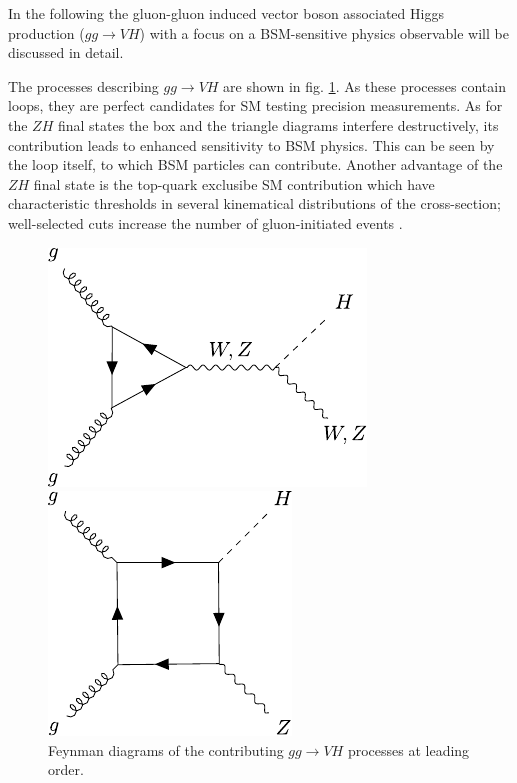 In the following the gluon-gluon induced vector boson associated Higgs production ($gg\rightarrow VH$) with a focus on a BSM-sensitive physics observable will be discussed in detail.


The processes describing $gg\rightarrow VH$ are shown in fig. \ref{fig:VH_diagrams}. As these processes contain loops, they are perfect candidates for SM testing precision measurements. As for the $ZH$ final states the box and the triangle diagrams interfere destructively, its contribution leads to enhanced sensitivity to BSM physics. This can be seen by the loop itself, to which BSM particles can contribute. Another advantage of the $ZH$ final state is the top-quark exclusibe SM contribution which have characteristic thresholds in several kinematical distributions of the cross-section; well-selected cuts increase the number of gluon-initiated events \cite{Harlander_2018}.

\begin{figure}[h!]
	\centering
	\begin{minipage}{.5\textwidth}
		\centering
		\includegraphics[width=0.8\linewidth]{figures/theory/diagrams/ggVH_triangle.pdf}
	\end{minipage}%
	\begin{minipage}{.5\textwidth}
		\centering
		\includegraphics[width=0.6\linewidth]{figures/theory/diagrams/ggZH_box.pdf}
	\end{minipage}
	\caption{Feynman diagrams of the contributing $gg\rightarrow VH$ processes at leading order.}
	\label{fig:VH_diagrams}
\end{figure}

